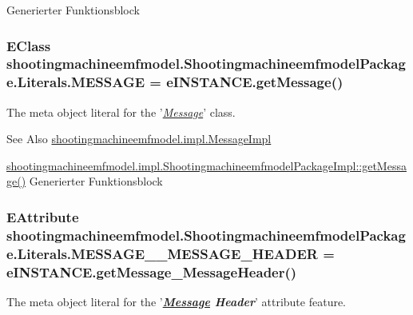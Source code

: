 Generierter Funktionsblock \hypertarget{interfaceshootingmachineemfmodel_1_1_shootingmachineemfmodel_package_1_1_literals_ab0be4348efbb58889f96804263c8b934}{
\subsubsection[{M\-E\-S\-S\-A\-G\-E}]{\setlength{\rightskip}{0pt plus 5cm}E\-Class shootingmachineemfmodel.\-Shootingmachineemfmodel\-Package.\-Literals.\-M\-E\-S\-S\-A\-G\-E = e\-I\-N\-S\-T\-A\-N\-C\-E.\-get\-Message()}}\label{interfaceshootingmachineemfmodel_1_1_shootingmachineemfmodel_package_1_1_literals_ab0be4348efbb58889f96804263c8b934}
The meta object literal for the '\hyperlink{classshootingmachineemfmodel_1_1impl_1_1_message_impl}{{\itshape Message}}' class.

\begin{DoxySeeAlso}{See Also}
\hyperlink{classshootingmachineemfmodel_1_1impl_1_1_message_impl}{shootingmachineemfmodel.\-impl.\-Message\-Impl} 

\hyperlink{classshootingmachineemfmodel_1_1impl_1_1_shootingmachineemfmodel_package_impl_ac5110626e0726dd7b9161fc57637d468}{shootingmachineemfmodel.\-impl.\-Shootingmachineemfmodel\-Package\-Impl\-::get\-Message()} Generierter Funktionsblock 
\end{DoxySeeAlso}
\hypertarget{interfaceshootingmachineemfmodel_1_1_shootingmachineemfmodel_package_1_1_literals_ac9c85c0837360031ccab61c9f987e8c9}{
\subsubsection[{M\-E\-S\-S\-A\-G\-E\-\_\-\-\_\-\-M\-E\-S\-S\-A\-G\-E\-\_\-\-H\-E\-A\-D\-E\-R}]{\setlength{\rightskip}{0pt plus 5cm}E\-Attribute shootingmachineemfmodel.\-Shootingmachineemfmodel\-Package.\-Literals.\-M\-E\-S\-S\-A\-G\-E\-\_\-\-\_\-\-M\-E\-S\-S\-A\-G\-E\-\_\-\-H\-E\-A\-D\-E\-R = e\-I\-N\-S\-T\-A\-N\-C\-E.\-get\-Message\-\_\-\-Message\-Header()}}\label{interfaceshootingmachineemfmodel_1_1_shootingmachineemfmodel_package_1_1_literals_ac9c85c0837360031ccab61c9f987e8c9}
The meta object literal for the '{\itshape {\bfseries \hyperlink{interfaceshootingmachineemfmodel_1_1_message}{Message} Header}}' attribute feature.

